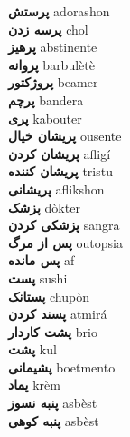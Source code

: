 \textbf{ پرستش  } adorashon \\
\textbf{ پرسه زدن  } chol \\
\textbf{ پرهیز  } abstinente \\
\textbf{ پروانه  } barbulètè \\
\textbf{ پروژکتور  } beamer \\
\textbf{ پرچم  } bandera \\
\textbf{ پری  } kabouter \\
\textbf{ پریشان خیال  } ousente \\
\textbf{ پریشان کردن  } afligí \\
\textbf{ پریشان کننده  } tristu \\
\textbf{ پریشانی  } aflikshon \\
\textbf{ پزشک  } dòkter \\
\textbf{ پزشکی کردن  } sangra \\
\textbf{ پس از مرگ  } outopsia \\
\textbf{ پس مانده  } af \\
\textbf{ پست  } sushi \\
\textbf{ پستانک  } chupòn \\
\textbf{ پسند کردن  } atmirá \\
\textbf{ پشت کاردار  } brio \\
\textbf{ پشت  } kul \\
\textbf{ پشیمانی  } boetmento \\
\textbf{ پماد  } krèm \\
\textbf{ پنبه نسوز  } asbèst \\
\textbf{ پنبه کوهی  } asbèst \\
